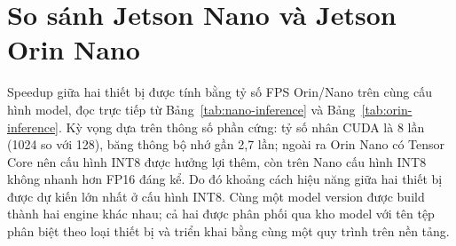 \section{So sánh Jetson Nano và Jetson Orin Nano}

Speedup giữa hai thiết bị được tính bằng tỷ số FPS Orin/Nano trên cùng cấu hình
model, đọc trực tiếp từ Bảng~\ref{tab:nano-inference} và
Bảng~\ref{tab:orin-inference}. Kỳ vọng dựa trên thông số phần cứng: tỷ số nhân
CUDA là 8 lần (1024 so với 128), băng thông bộ nhớ gần 2,7 lần; ngoài ra Orin
Nano có Tensor Core nên cấu hình INT8 được hưởng lợi thêm, còn trên Nano cấu
hình INT8 không nhanh hơn FP16 đáng kể. Do đó khoảng cách hiệu năng giữa hai thiết
bị được dự kiến lớn nhất ở cấu hình INT8. Cùng một model version được build thành
hai engine khác nhau; cả hai được phân phối qua kho model với tên tệp phân biệt
theo loại thiết bị và triển khai bằng cùng một quy trình trên nền tảng.
